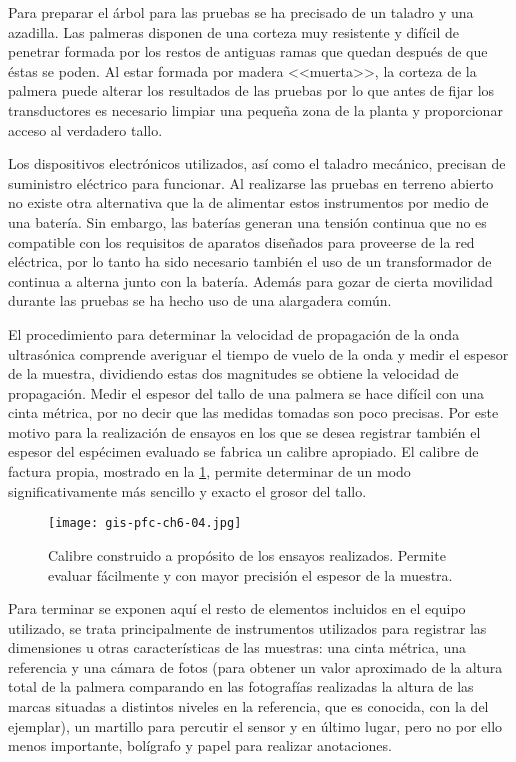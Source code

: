 Para preparar el árbol para las pruebas se ha precisado de un taladro y una
azadilla. Las palmeras disponen de una corteza muy resistente y difícil de
penetrar formada por los restos de antiguas ramas que quedan después de que
éstas se poden. Al estar formada por madera <<muerta>>, la corteza de la
palmera puede alterar los resultados de las pruebas por lo que antes de
fijar los transductores es necesario limpiar una pequeña zona de la planta
y proporcionar acceso al verdadero tallo.

Los dispositivos electrónicos utilizados, así como el taladro mecánico,
precisan de suministro eléctrico para funcionar. Al realizarse las pruebas
en terreno abierto no existe otra alternativa que la de alimentar estos
instrumentos por medio de una batería. Sin embargo, las baterías generan
una tensión continua que no es compatible con los requisitos de aparatos
diseñados para proveerse de la red eléctrica, por lo tanto ha sido
necesario también el uso de un transformador de continua a alterna junto
con la batería. Además para gozar de cierta movilidad durante las pruebas
se ha hecho uso de una alargadera común.

El procedimiento para determinar la velocidad de propagación de la onda
ultrasónica comprende averiguar el tiempo de vuelo de la onda y medir el
espesor de la muestra, dividiendo estas dos magnitudes se obtiene la
velocidad de propagación. Medir el espesor del tallo de una palmera se hace
difícil con una cinta métrica, por no decir que las medidas tomadas son
poco precisas. Por este motivo para la realización de ensayos en los que se
desea registrar también el espesor del espécimen evaluado se fabrica un
calibre apropiado. El calibre de factura propia, mostrado en la
\cref{fig:calibre}, permite determinar de un modo significativamente más
sencillo y exacto el grosor del tallo.

\begin{figure}
    \begin{center}
	\texttt{[image: gis-pfc-ch6-04.jpg]}
    \end{center}
    \caption[Calibre en los ensayos]{Calibre construido a propósito de los
    ensayos realizados. Permite evaluar fácilmente y con mayor precisión el
    espesor de la muestra.}
    \label{fig:calibre}
\end{figure}

Para terminar se exponen aquí el resto de elementos incluidos en el equipo
utilizado, se trata principalmente de instrumentos utilizados para
registrar las dimensiones u otras características de las muestras: una
cinta métrica, una referencia y una cámara de fotos (para obtener un valor
aproximado de la altura total de la palmera comparando en las fotografías
realizadas la altura de las marcas situadas a distintos niveles en la
referencia, que es conocida, con la del ejemplar), un martillo para
percutir el sensor y en último lugar, pero no por ello menos importante,
bolígrafo y papel para realizar anotaciones.


